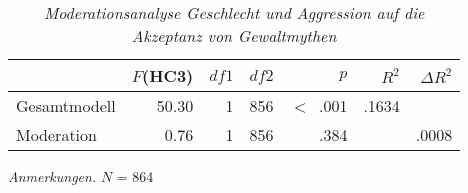 \begin{table}[htb]
    \caption[Moderationsanalyse Geschlecht und Aggression auf die Akzeptanz von Gewaltmythen]{\textit {Moderationsanalyse Geschlecht und Aggression auf die Akzeptanz von Gewaltmythen}} 
    \label{Moderationsanalyse}
    \centering
    \begin{adjustbox}{width=11cm} %
    \small
    \begin{tabular}{lrrrrrr}
      \hline
        & $F$(HC3) & $df1$ & $df2$ & $p$ & $R^{2}$ & $\Delta R^{2}$ \\
      \hline
    Gesamtmodell & 50.30  & 1 & 856 & $<$~.001 & .1634 &       \\
    Moderation   & 0.76   & 1 & 856 & .384     &       & .0008 \\
       \hline
    \end{tabular}
    \end{adjustbox}
    
    \begin{tablenotes}
        \item \textit{Anmerkungen.} \( N \) = 864%
      \end{tablenotes}
    \end{table}

